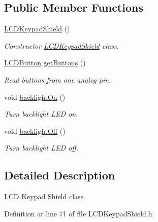 \subsection*{Public Member Functions}
\begin{DoxyCompactItemize}
\item 
\hyperlink{class_l_c_d_keypad_shield_ad26ce3a3a5c3300f0af024149bf87bb4}{L\+C\+D\+Keypad\+Shield} ()
\begin{DoxyCompactList}\small\item\em Constructor \hyperlink{class_l_c_d_keypad_shield}{L\+C\+D\+Keypad\+Shield} class. \end{DoxyCompactList}\item 
\hyperlink{_l_c_d_keypad_shield_8h_a024ede13291704606f2369e2d8798b1d}{L\+C\+D\+Button} \hyperlink{class_l_c_d_keypad_shield_ad8660e937c391344b3520d7610d7a3dc}{get\+Buttons} ()
\begin{DoxyCompactList}\small\item\em Read buttons from one analog pin. \end{DoxyCompactList}\item 
void \hyperlink{class_l_c_d_keypad_shield_abbdc6a191e247e5b8a12fe5d73b6431c}{backlight\+On} ()\hypertarget{class_l_c_d_keypad_shield_abbdc6a191e247e5b8a12fe5d73b6431c}{}\label{class_l_c_d_keypad_shield_abbdc6a191e247e5b8a12fe5d73b6431c}

\begin{DoxyCompactList}\small\item\em Turn backlight L\+ED on. \end{DoxyCompactList}\item 
void \hyperlink{class_l_c_d_keypad_shield_a7fcbbc1f3793be56707860e6892343fc}{backlight\+Off} ()\hypertarget{class_l_c_d_keypad_shield_a7fcbbc1f3793be56707860e6892343fc}{}\label{class_l_c_d_keypad_shield_a7fcbbc1f3793be56707860e6892343fc}

\begin{DoxyCompactList}\small\item\em Turn backlight L\+ED off. \end{DoxyCompactList}\end{DoxyCompactItemize}


\subsection{Detailed Description}
L\+CD Keypad Shield class. 

Definition at line 71 of file L\+C\+D\+Keypad\+Shield.\+h.



